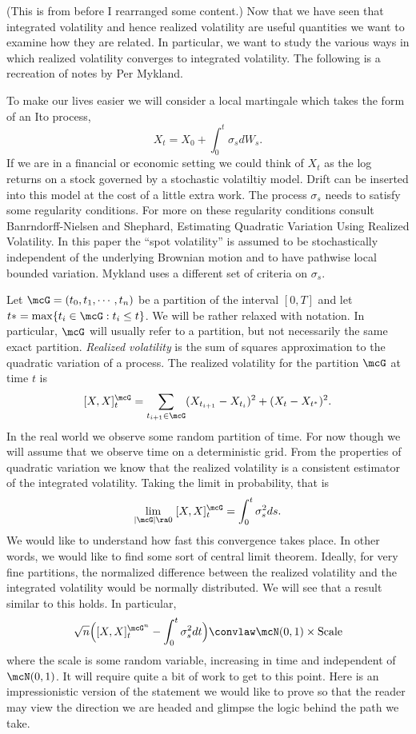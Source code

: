 \documentclass{report}
\begin{document}
(This is from before I rearranged some content.)
Now that we have seen that integrated volatility and hence realized
volatility are useful quantities we want to examine how they are
related.  In particular, we want to study the various ways in which
realized volatility converges to integrated volatility.  The following
is a recreation of notes by Per Mykland.

To make our lives easier we will consider a local martingale which
takes the form of an Ito process,
\[
X_t = X_0 + \int_0^t \sigma_s dW_s.
\]
If we are in a financial or economic setting we could think of $X_t$
as the log returns on a stock governed by a stochastic volatiltiy
model.  Drift can be inserted into this model at the cost of a little
extra work.  The process $\sigma_s$ needs to satisfy some regularity
conditions.  For more on these regularity conditions consult
Banrndorff-Nielsen and Shephard, Estimating Quadratic Variation Using
Realized Volatility.  In this paper the ``spot volatility'' is assumed
to be stochastically independent of the underlying Brownian motion and
to have pathwise local bounded variation.  Mykland uses a different
set of criteria on $\sigma_s$.

Let $\mcG = (t_0, t_1, \cdots, t_n)$ be a partition of the interval
$[0,T]$ and let $t* = \max \{ t_i \in \mcG : t_i \leq t \}$.  We will
be rather relaxed with notation.  In particular, $\mcG$ will usually
refer to a partition, but not necessarily the same exact partition.  
\emph{Realized volatility} is the sum of squares approximation to the
quadratic variation of a process.  The realized volatility for the
partition $\mcG$ at time $t$ is
\[
[X,X]^{\mcG}_t = \sum_{t_{i+1} \in \mcG} (X_{t_{i+1}} - X_{t_i})^2 +
(X_{t} - X_{t^*})^2.
\]
In the real world we observe some random partition of time.  For now
though we will assume that we observe time on a deterministic grid. 
From the properties of quadratic variation we know that the realized
volatility is a consistent estimator of the integrated volatility. 
Taking the limit in probability, that is
\[
\lim_{|\mcG| \ra 0} \; [X,X]^{\mcG}_t = \int_0^t \sigma_s^2 ds.
\]
We would like to understand how fast this convergence takes place.  In
other words, we would like to find some sort of central limit theorem. 
Ideally, for very fine partitions, the normalized difference between
the realized volatility and the integrated volatility would be
normally distributed.  We will see that a result similar to this
holds.  In particular,
\[
\sqrt{n} \Big([X,X]^{\mcG^n}_t - \int_0^t \sigma_s^2 dt \Big) \convlaw
\mcN(0,1) \times \textmd{Scale}
\]
where the scale is some random variable, increasing in time and
independent of $\mcN(0,1)$.  It will require quite a bit of work to
get to this point.  Here is an impressionistic version of the
statement we would like to prove so that the reader may view the
direction we are headed and glimpse the logic behind the path we take.
\end{document}
